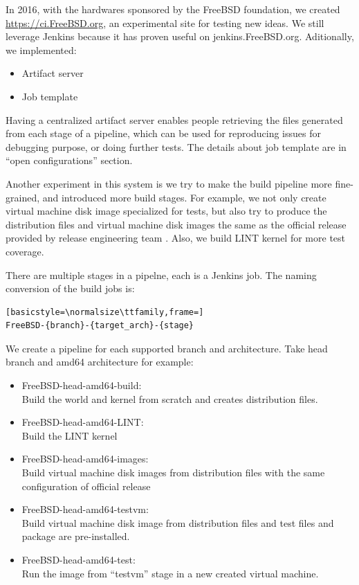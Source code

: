 \documentclass[a4paper,twocolumn,10pt]{article}
\begin{document}
In 2016, with the hardwares sponsored by the FreeBSD foundation, we created
\url{https://ci.FreeBSD.org}, an experimental site for testing new ideas. We
still leverage Jenkins because it has proven useful on jenkins.FreeBSD.org.
Aditionally, we implemented:

\begin{itemize}
\item Artifact server
\item Job template
\end{itemize}

Having a centralized artifact server enables people retrieving the files
generated from each stage of a pipeline, which can be used for reproducing
issues for debugging purpose, or doing further tests. The details about job
template are in ``open configurations'' section.

Another experiment in this system is we try to make the build pipeline more
fine-grained, and introduced more build stages. For example, we not only create
virtual machine disk image specialized for tests, but also try to produce the
distribution files and virtual machine disk images the same as the official
release provided by release engineering team . Also, we build LINT kernel for
more test coverage.

There are multiple stages in a pipelne, each is a Jenkins job. The naming
conversion of the build jobs is:
\begin{lstlisting}[basicstyle=\normalsize\ttfamily,frame=]
FreeBSD-{branch}-{target_arch}-{stage}
\end{lstlisting}
We create a pipeline for each supported branch and architecture.
Take head branch and amd64 architecture for example:

\begin{itemize}
\item FreeBSD-head-amd64-build:\\
  Build the world and kernel from scratch and creates distribution files.
\item FreeBSD-head-amd64-LINT:\\
  Build the LINT kernel
\item FreeBSD-head-amd64-images:\\
  Build virtual machine disk images from distribution files with the same configuration of official release
\item FreeBSD-head-amd64-testvm:\\
  Build virtual machine disk image from distribution files and test files and package are pre-installed.
\item FreeBSD-head-amd64-test:\\
  Run the image from ``testvm'' stage in a new created virtual machine.
\end{itemize}
\end{document}
